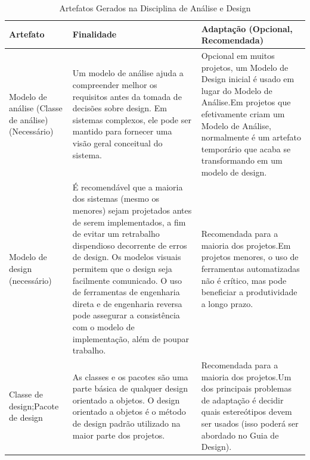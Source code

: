 \begin{longtable}{||p{3cm}|p{5cm}|p{5cm}||}
\caption{Artefatos Gerados na Disciplina de Análise e Design}
\\ \hline
\textbf{Artefato} & \textbf{Finalidade} & \textbf{Adaptação (Opcional, Recomendada)} \\ \hline \hline                                                                                                                                                                                  
Modelo de análise (Classe de análise) (Necessário) & Um modelo de análise ajuda a compreender melhor os requisitos antes da tomada de decisões sobre design. Em sistemas complexos, ele pode ser mantido para fornecer uma visão geral conceitual do sistema.                                                                                                                                                                                                          & Opcional em muitos projetos, um Modelo de Design inicial é usado em lugar do Modelo de Análise.Em projetos que efetivamente criam um Modelo de Análise, normalmente é um artefato temporário que acaba se transformando em um modelo de design.                                                                                                                                   \\ \hline
Modelo de design (necessário)                      & É recomendável que a maioria dos sistemas (mesmo os menores) sejam projetados antes de serem implementados, a fim de evitar um retrabalho dispendioso decorrente de erros de design. Os modelos visuais permitem que o design seja facilmente comunicado. O uso de ferramentas de engenharia direta e de engenharia reversa pode assegurar a consistência com o modelo de implementação, além de poupar trabalho. & Recomendada para a maioria dos projetos.Em projetos menores, o uso de ferramentas automatizadas não é crítico, mas pode beneficiar a produtividade a longo prazo.                                                                                                                                                                                                                \\ \hline
Classe de design;Pacote de design                  & As classes e os pacotes são uma parte básica de qualquer design orientado a objetos. O design orientado a objetos é o método de design padrão utilizado na maior parte dos projetos.                                                                                                                                                                                                                              & Recomendada para a maioria dos projetos.Um dos principais problemas de adaptação é decidir quais estereótipos devem ser usados (isso poderá ser abordado no Guia de Design).                                                                                                                                                                                                     \\ \hline

\end{longtable}
